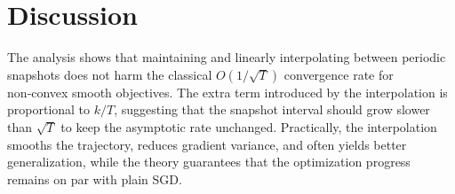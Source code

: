 \documentclass{article}
\theoremstyle{definition}
\begin{document}
\section*{Discussion}
The analysis shows that maintaining and linearly interpolating between
periodic snapshots does not harm the classical $O(1/\sqrt{T})$ convergence rate
for non‑convex smooth objectives.  The extra term introduced by the
interpolation is proportional to $k/T$, suggesting that the snapshot interval
should grow slower than $\sqrt{T}$ to keep the asymptotic rate unchanged.
Practically, the interpolation smooths the trajectory, reduces gradient
variance, and often yields better generalization, while the theory guarantees
that the optimization progress remains on par with plain SGD.
\end{document}
